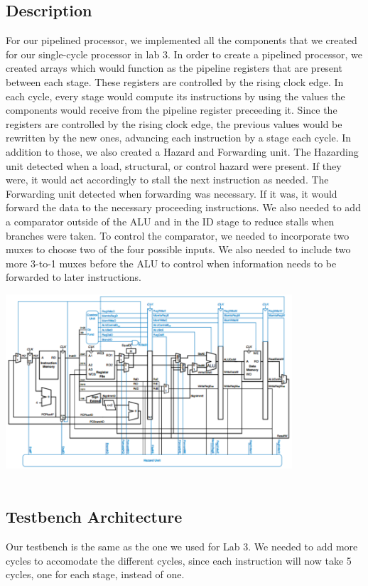 \documentclass{article}
\begin{document}
\subsection{Description}
For our pipelined processor, we implemented all the components that we created for our single-cycle processor in lab 3. In order to create a pipelined processor, we created arrays which would function as the pipeline registers that are present between each stage. These registers are controlled by the rising clock edge. In each cycle, every stage would compute its instructions by using the values the components would receive from the pipeline register preceeding it. Since the registers are controlled by the rising clock edge, the previous values would be rewritten by the new ones, advancing each instruction by a stage each cycle.  In addition to those, we also created a Hazard and Forwarding unit. The Hazarding unit detected when a load, structural, or control hazard were present. If they were, it would act accordingly to stall the next instruction as needed. The Forwarding unit detected when forwarding was necessary. If it was, it would forward the data to the necessary proceeding instructions. We also needed to add a comparator outside of the ALU and in the ID stage to reduce stalls when branches were taken. To control the comparator, we needed to incorporate two muxes to choose two of the four possible inputs. We also needed to include two more 3-to-1 muxes before the ALU to control when information needs to be forwarded to later instructions.

\includegraphics[width=0.8\textwidth]{PipelinedDatapath.png} \\ \\


\subsection{Testbench Architecture}
Our testbench is the same as the one we used for Lab 3. We needed to add more cycles to accomodate the different cycles, since each instruction will now take 5 cycles, one for each stage, instead of one.
\end{document}

